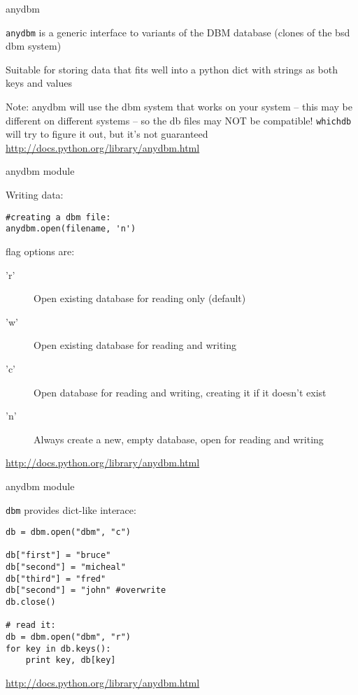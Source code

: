 \documentclass{beamer}
\begin{document}
\begin{frame}[fragile]{anydbm}

\vfill
{\Large \verb|anydbm| is a generic interface to variants of the DBM database (clones of the bsd dbm system)}

{\Large Suitable for storing data that fits well into a python dict with strings as both keys and values}

{\Large Note: anydbm will use the dbm system that works on your system --
        this may be different on different systems -- so the db files may NOT
        be compatible! \verb|whichdb| will try to figure it out, but it's not
        guaranteed}
\vfill
\url{http://docs.python.org/library/anydbm.html}
\end{frame} 

\begin{frame}[fragile]{anydbm module}

{\Large Writing data:}

\begin{verbatim}
#creating a dbm file:
anydbm.open(filename, 'n') 
\end{verbatim}

{\large flag options are: }
\begin{description}
  \item['r'] 	Open existing database for reading only (default)
  \item['w'] 	Open existing database for reading and writing
  \item['c'] 	Open database for reading and writing, creating it if it doesn’t exist
  \item['n'] 	Always create a new, empty database, open for reading and writing
\end{description}
\vfill
\url{http://docs.python.org/library/anydbm.html}
\end{frame}

\begin{frame}[fragile]{anydbm module}

{\Large \verb|dbm| provides dict-like interace:}

\begin{verbatim}
db = dbm.open("dbm", "c")

db["first"] = "bruce"
db["second"] = "micheal"
db["third"] = "fred"
db["second"] = "john" #overwrite
db.close()

# read it:
db = dbm.open("dbm", "r")
for key in db.keys():
    print key, db[key]
\end{verbatim}

\vfill
\url{http://docs.python.org/library/anydbm.html}
\end{frame}
\end{document}
